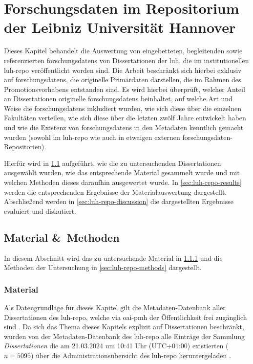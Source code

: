 \chapter{Forschungsdaten im Repositorium der Leibniz Universität Hannover}\label{ch:luh-repo}
Dieses Kapitel behandelt die Auswertung von eingebetteten, begleitenden sowie referenzierten \glspl{forschungsdaten} von Dissertationen der \gls{luh}, die im institutionellen \gls{luh-repo} veröffentlicht worden sind.
Die Arbeit beschränkt sich hierbei exklusiv auf \glspl{forschungsdaten}, die originelle Primärdaten darstellen, die im Rahmen des Promotionsvorhabens entstanden sind.
Es wird hierbei überprüft, welcher Anteil an Dissertationen originelle \glspl{forschungsdaten} beinhaltet, auf welche Art und Weise die \glspl{forschungsdaten} inkludiert wurden, wie sich diese über die einzelnen Fakultäten verteilen, wie sich diese über die letzten zwölf Jahre entwickelt haben und wie die Existenz von \glspl{forschungsdaten} in den Metadaten kenntlich gemacht wurden (sowohl im \gls{luh-repo} wie auch in etwaigen externen \gls{forschungsdaten}-Repositorien).

Hierfür wird in \cref{sec:luh-repo-material-methods} aufgeführt, wie die zu untersuchenden Dissertationen ausgewählt wurden, wie das entsprechende Material gesammelt wurde und mit welchen Methoden dieses daraufhin ausgewertet wurde.
In \cref{sec:luh-repo-results} werden die entsprechenden Ergebnisse der Materialauswertung dargestellt.
Abschließend werden in \cref{sec:luh-repo-discussion} die dargestellten Ergebnisse evaluiert und diskutiert.

\section{Material \&\ Methoden}\label{sec:luh-repo-material-methods}
In diesem Abschnitt wird das zu untersuchende Material in \cref{sec:luh-repo-material} und die Methoden der Untersuchung in \cref{sec:luh-repo-methods} dargestellt.

\subsection{Material}\label{sec:luh-repo-material}
Als Datengrundlage für dieses Kapitel gilt die Metadaten-Datenbank aller Dissertationen des \gls{luh-repo}, welche via \gls{oai-pmh} der Öffentlichkeit frei zugänglich sind \autocite{luh-repo}.
Da sich das Thema dieses Kapitels explizit auf Dissertationen beschränkt, wurden von der Metadaten-Datenbank des \gls{luh-repo} alle Einträge der Sammlung \textit{Dissertationen} die am 21.03.2024 um 10:41 Uhr (UTC+01:00) existierten ($n=5095$) über die Administrationsübersicht des \gls{luh-repo} heruntergeladen \autocite{my-dataset}.

